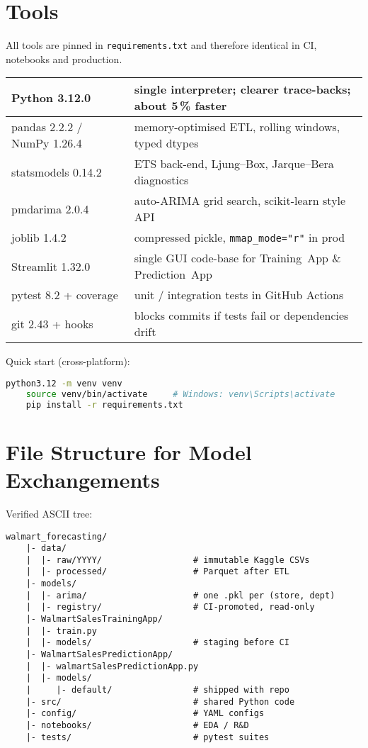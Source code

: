 \section{Tools} %
All tools are pinned in \texttt{requirements.txt} and therefore identical in CI, notebooks and production.

\begin{table}[h]
	\centering\small
	\begin{tabular}{|l|p{7.6cm}|}
		\hline
		Python 3.12.0 & single interpreter; clearer trace-backs; about 5\,\% faster \\ \hline
		pandas 2.2.2 / NumPy 1.26.4 & memory-optimised ETL, rolling windows, typed dtypes \\ \hline
		statsmodels 0.14.2 & ETS back-end, Ljung--Box, Jarque--Bera diagnostics \\ \hline
		pmdarima 2.0.4 & auto-ARIMA grid search, scikit-learn style API \\ \hline
		joblib 1.4.2 & compressed pickle, \verb|mmap_mode="r"| in prod \\ \hline
		Streamlit 1.32.0 & single GUI code-base for Training~App \& Prediction~App \\ \hline
		pytest 8.2 + coverage & unit / integration tests in GitHub Actions \\ \hline
		git 2.43 + hooks & blocks commits if tests fail or dependencies drift \\ \hline
	\end{tabular}
\end{table}

Quick start (cross-platform):

\begin{lstlisting}[language=bash,basicstyle=\ttfamily\small]
	python3.12 -m venv venv
	source venv/bin/activate     # Windows: venv\Scripts\activate
	pip install -r requirements.txt
\end{lstlisting}

\section{File Structure for Model Exchangements} %
Verified ASCII tree:

\begin{lstlisting}[basicstyle=\ttfamily\footnotesize]
	walmart_forecasting/
	|- data/
	|  |- raw/YYYY/                  # immutable Kaggle CSVs
	|  |- processed/                 # Parquet after ETL
	|- models/
	|  |- arima/                     # one .pkl per (store, dept)
	|  |- registry/                  # CI-promoted, read-only
	|- WalmartSalesTrainingApp/
	|  |- train.py
	|  |- models/                    # staging before CI
	|- WalmartSalesPredictionApp/
	|  |- walmartSalesPredictionApp.py
	|  |- models/
	|     |- default/                # shipped with repo
	|- src/                          # shared Python code
	|- config/                       # YAML configs
	|- notebooks/                    # EDA / R&D
	|- tests/                        # pytest suites
\end{lstlisting}

